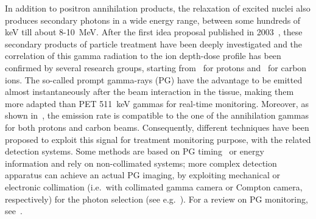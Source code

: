 In addition to positron annihilation products, the relaxation of excited nuclei also produces secondary photons in a wide energy range, between some hundreds of keV till about 8-10~MeV. After the first idea proposal published in 2003~\cite{PG_first}, these secondary products of particle treatment have been deeply investigated and the correlation of this gamma radiation to the ion depth-dose profile has been confirmed by several research groups, starting from~\cite{Min_PG} for protons and~\cite{Testa_PG} for carbon ions. The so-called prompt gamma-rays (PG) have the advantage to be emitted almost instantaneously after the beam interaction in the tissue, making them more adapted than PET 511~keV gammas for real-time monitoring. Moreover, as shown in~\cite{Robert2013}, the emission rate is compatible to the one of the annihilation gammas for both protons and carbon beams. Consequently, different techniques have been proposed to exploit this signal for treatment monitoring purpose, with the related detection systems. Some methods are based on PG timing~\cite{Golnik:2014aa, Krimmer_PGPI} or energy~\cite{Verburg:2014aa} information and rely on non-collimated systems; more complex detection apparatus can achieve an actual PG imaging, by exploiting mechanical or electronic collimation (i.e.~with collimated gamma camera or Compton camera, respectively) for the photon selection (see e.g.~\cite{Min_PG, Bom_collimated, Priegnitz:2015aa, Smeets:2012aa, Roellinghoff_2014, Frandes_2010, LLOSA2012105, KORMOLL2011114, MCCLESKEY2015163, Matsuoka:2014qna, Peterson:2010aa, Solevi:2016aa, ALDAWOOD2017190}). For a review on PG monitoring, see~\cite{krimmer:hal-01585334}.


